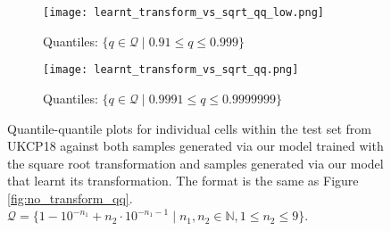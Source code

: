 \documentclass[ oneside,%
                    author={George Herbert},
                    degree={MSci},
                     title={Video Diffusion Models for Climate Simulations},
                  subtitle={}]{dissertation}
\begin{document}
\begin{figure}[htbp]
      \centering
      \begin{subfigure}{.485\textwidth}
            \texttt{[image: learnt\_transform\_vs\_sqrt\_qq\_low.png]}
            \caption{Quantiles: $\{q\in\mathcal{Q}\mid 0.91 \le q \le 0.999\}$}
            \label{fig:learnt_transform_vs_sqrt_qq_low}
      \end{subfigure}
      \begin{subfigure}{.495\textwidth}
            \texttt{[image: learnt\_transform\_vs\_sqrt\_qq.png]}
            \caption{Quantiles: $\{q\in\mathcal{Q}\mid 0.9991 \le q \le 0.9999999 \}$}
            \label{fig:learnt_transform_vs_sqrt_qq_upper}
      \end{subfigure}
      \caption{Quantile-quantile plots for individual cells within the test set from UKCP18 against both samples generated via our model trained with the square root transformation and samples generated via our model that learnt its transformation. The format is the same as Figure \ref{fig:no_transform_qq}. $\mathcal{Q} = \{1 - 10^{-n_1} + n_2 \cdot 10^{-n_1 - 1}\mid n_1,n_2\in \mathbb{N}, 1 \le n_2 \le 9\}$.}
      \label{fig:learnt_transform_vs_sqrt_qq}
\end{figure}


\end{document}
